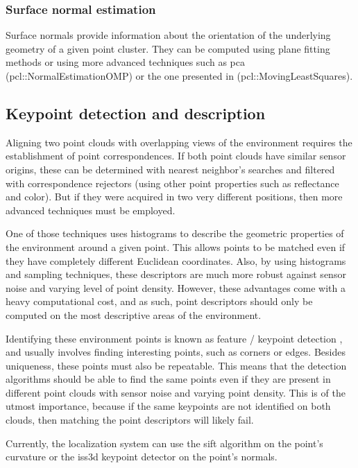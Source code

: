 \subsubsection{Surface normal estimation}

Surface normals provide information about the orientation of the underlying geometry of a given point cluster. They can be computed using plane fitting methods or using more advanced techniques such as \gls{pca} \cite{Jolliffe2002} (pcl::NormalEstimationOMP) or the one presented in  (pcl::MovingLeastSquares).


\subsection{Keypoint detection and description}

Aligning two point clouds with overlapping views of the environment requires the establishment of point correspondences. If both point clouds have similar sensor origins, these can be determined with nearest neighbor's searches and filtered with correspondence rejectors (using other point properties such as reflectance and color). But if they were acquired in two very different positions, then more advanced techniques must be employed.

One of those techniques uses histograms to describe the geometric properties of the environment around a given point. This allows points to be matched even if they have completely different Euclidean coordinates. Also, by using histograms and sampling techniques, these descriptors are much more robust against sensor noise and varying level of point density. However, these advantages come with a heavy computational cost, and as such, point descriptors should only be computed on the most descriptive areas of the environment.

Identifying these environment points is known as feature / keypoint detection \cite{Filipe2014a}, and usually involves finding interesting points, such as corners or edges. Besides uniqueness, these points must also be repeatable. This means that the detection algorithms should be able to find the same points even if they are present in different point clouds with sensor noise and varying point density. This is of the utmost importance, because if the same keypoints are not identified on both clouds, then matching the point descriptors will likely fail.

Currently, the localization system can use the \gls{sift} \cite{Lowe2004} algorithm on the point's curvature or the \gls{iss3d} \cite{Zhong2009} keypoint detector on the point's normals.


